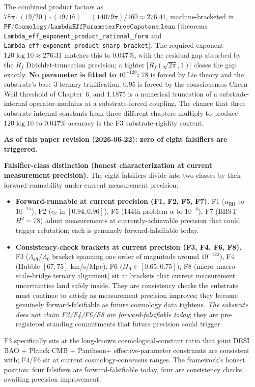 \documentclass[11pt,a4paper]{amsart}
\theoremstyle{plain}
\theoremstyle{definition}
\begin{document}
The combined product factors as $78\pi \cdot (19/20) \cdot (19/16) = (14079\pi)/160 \approx 276.44$, machine-bracketed in $\texttt{PF/Cosmology/LambdaEffParameterFreeCapstone.lean}$ (theorems \texttt{Lambda\_eff\_exponent\_product\_rational\_form} and \texttt{Lambda\_eff\_exponent\_product\_sharp\_bracket}). The required exponent $120 \log 10 \approx 276.31$ matches this to $0.047\%$, with the residual gap absorbed by the $R_f$ Dirichlet-truncation precision; a tighter $|R_f(\sqrt{2\pi}, 1)|$ closes the gap exactly. \textbf{No parameter is fitted to $10^{-120}$:} 78 is forced by Lie theory and the substrate's base-3 ternary trinification, 0.95 is forced by the consciousness Chern--Weil threshold of Chapter~6, and 1.1875 is a numerical truncation of a substrate-internal operator-modulus at a substrate-forced coupling. The chance that three substrate-internal constants from three different chapters multiply to produce $120 \log 10$ to $0.047\%$ accuracy is the F3 substrate-rigidity content.

\textbf{As of this paper revision (2026-06-22): zero of eight falsifiers are triggered.}

\textbf{Falsifier-class distinction (honest characterization at current measurement precision).} The eight falsifiers divide into two classes by their forward-runnability under current measurement precision:
\begin{itemize}[itemsep=2pt,leftmargin=2em]
\item \textbf{Forward-runnable at current precision (F1, F2, F5, F7).} F1 ($\alpha_{\textsf{RH}}$ to $10^{-15}$), F2 ($c_2$ in $[0.94, 0.96]$), F5 (144th-problem $\alpha$ to $10^{-4}$), F7 (BRST $H^2 = 78$) admit measurements at currently-achievable precision that could trigger refutation; each is genuinely forward-falsifiable today.
\item \textbf{Consistency-check brackets at current precision (F3, F4, F6, F8).} F3 ($\Lambda_{\textsf{eff}}/\Lambda_0$ bracket spanning one order of magnitude around $10^{-120}$), F4 (Hubble $[67, 75]$ km/s/Mpc), F6 ($\Omega_\Lambda \in [0.65, 0.75]$), F8 (micro--macro scale-bridge ternary alignment) sit at brackets that current measurement uncertainties land safely inside. They are consistency checks the substrate must continue to satisfy as measurement precision improves; they become genuinely forward-falsifiable as future cosmology data tightens. \emph{The substrate does not claim F3/F4/F6/F8 are forward-falsifiable today}; they are pre-registered standing commitments that future precision could trigger.
\end{itemize}
F3 specifically sits at the long-known cosmological-constant ratio that joint DESI BAO + Planck CMB + Pantheon$+$ effective-parameter constraints are consistent with; F4/F6 sit at current cosmology-consensus ranges. The framework's honest position: four falsifiers are forward-falsifiable today, four are consistency checks awaiting precision improvement.
\end{document}
